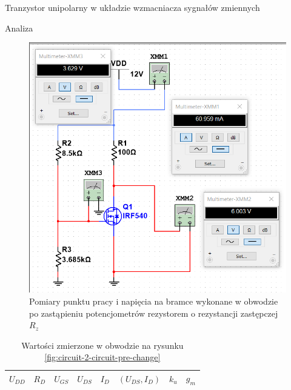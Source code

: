 \documentclass[a4paper]{scrartcl}
\begin{document}
\begin{section}{Tranzystor unipolarny w układzie wzmacniacza sygnałów zmiennych}
\begin{subsection}{Analiza}
				\begin{figure}[!ht]
					\begin{center}
						\includegraphics[width=.6\linewidth]{exercise-2-pomiary}
						\caption{Pomiary punktu pracy i napięcia na bramce wykonane w obwodzie po zastąpieniu potencjometrów rezystorem o rezystancji zastępczej $R_{z}$}
					\end{center}
				\end{figure}

				\begin{table}[!ht]
					\begin{center}
					\caption{Wartości zmierzone w obwodzie na rysunku \ref{fig:circuit-2-circuit-pre-change} }
					\begin{tabular}{| l | l | l | l | l | l | l | l |}
						\hline
						$ U_{DD} $ & $ R_{D} $ & $ U_{GS} $ & $ U_{DS} $ & $ I_{D} $ & $(U_{DS}, I_{D} )$ & $ k_{u} $ & $ g_{m} $ \\ \hline
					

\end{tabular}
\end{center}
\end{table}
\end{subsection}
\end{section}
\end{document}
